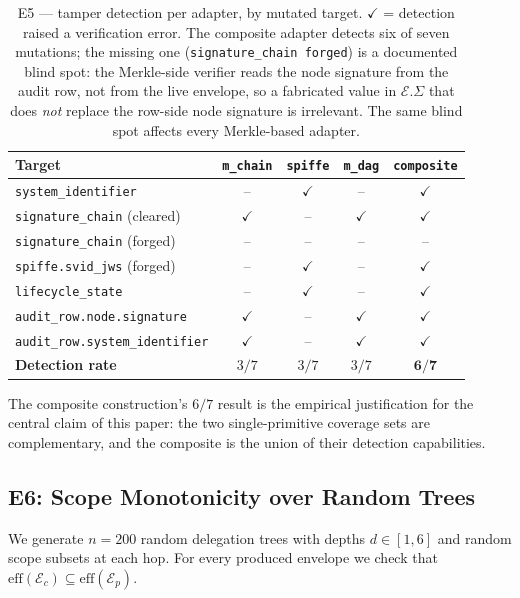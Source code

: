 \documentclass[11pt,a4paper]{article}
\begin{document}
\begin{table}[h]
\centering
\small
\caption{E5 --- tamper detection per adapter, by mutated target.
$\checkmark$ = detection raised a verification error. The composite
adapter detects six of seven mutations; the missing one
(\texttt{signature\_chain forged}) is a documented blind spot: the
Merkle-side verifier reads the node signature from the audit row, not
from the live envelope, so a fabricated value in
$\mathcal{E}.\Sigma$ that does \emph{not} replace the row-side node
signature is irrelevant. The same blind spot affects every Merkle-based
adapter.}\label{tab:e5}
\begin{tabular}{lcccc}
\toprule
Target & \texttt{m\_chain} & \texttt{spiffe} & \texttt{m\_dag} & \texttt{composite} \\
\midrule
\texttt{system\_identifier}            & --  & $\checkmark$ & --  & $\checkmark$ \\
\texttt{signature\_chain} (cleared)    & $\checkmark$ & --  & $\checkmark$ & $\checkmark$ \\
\texttt{signature\_chain} (forged)     & --  & --  & --  & --  \\
\texttt{spiffe.svid\_jws} (forged)     & --  & $\checkmark$ & --  & $\checkmark$ \\
\texttt{lifecycle\_state}              & --  & $\checkmark$ & --  & $\checkmark$ \\
\texttt{audit\_row.node.signature}     & $\checkmark$ & --  & $\checkmark$ & $\checkmark$ \\
\texttt{audit\_row.system\_identifier} & $\checkmark$ & --  & $\checkmark$ & $\checkmark$ \\
\midrule
\textbf{Detection rate}                & $3/7$ & $3/7$ & $3/7$ & $\mathbf{6/7}$ \\
\bottomrule
\end{tabular}
\end{table}

The composite construction's $6/7$ result is the empirical justification
for the central claim of this paper: the two single-primitive coverage
sets are complementary, and the composite is the union of their
detection capabilities.

\subsection{E6: Scope Monotonicity over Random Trees}\label{sec:e6}

We generate $n = 200$ random delegation trees with depths
$d \in [1, 6]$ and random scope subsets at each hop. For every produced
envelope we check that
$\text{eff}(\mathcal{E}_c) \subseteq \text{eff}(\mathcal{E}_p)$.
\end{document}
